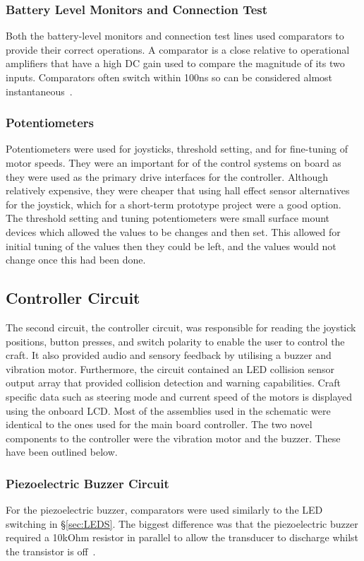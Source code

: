 \documentclass [12pt]{article}
\begin{document}
\subsubsection{Battery Level Monitors and Connection Test}\label{sec:comparator}
Both the battery-level monitors and connection test lines used comparators to provide their correct operations. A comparator is a close relative to operational amplifiers that have a high DC gain used to compare the magnitude of its two inputs. Comparators often switch within 100ns so can be considered almost instantaneous~\cite{parr1981}.

\subsubsection{Potentiometers}
Potentiometers were used for joysticks, threshold setting, and for fine-tuning of motor speeds. They were an important for of the control systems on board as they were used as the primary drive interfaces for the controller. Although relatively expensive, they were cheaper that using hall effect sensor alternatives for the joystick, which for a short-term prototype project were a good option. The threshold setting and tuning potentiometers were small surface mount devices which allowed the values to be changes and then set. This allowed for initial tuning of the values then they could be left, and the values would not change once this had been done.

\subsection{Controller Circuit}

The second circuit, the controller circuit, was responsible for reading the joystick positions, button presses, and switch polarity to enable the user to control the craft. It also provided audio and sensory feedback by utilising a buzzer and vibration motor. Furthermore, the circuit contained an LED collision sensor output array that provided collision detection and warning capabilities. Craft specific data such as steering mode and current speed of the motors is displayed using the onboard LCD. Most of the assemblies used in the schematic were identical to the ones used for the main board controller. The two novel components to the controller were the vibration motor and the buzzer. These have been outlined below.

\subsubsection{Piezoelectric Buzzer Circuit}
For the piezoelectric buzzer, comparators were used similarly to the LED switching in §\ref{sec:LEDS}. The biggest difference was that the piezoelectric buzzer required a 10kOhm resistor in parallel to allow the transducer to discharge whilst the transistor is off~\cite{ieee1666707}.
\end{document}
